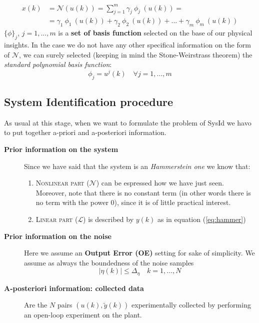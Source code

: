 \begin{equation}
    \begin{aligned}
        x(k)&=\mathcal{N}(u(k))=\sum_{j=1}^m {\gamma_j \ \phi_j\ (u(k)) }=\\
        &=\gamma_1\ {\phi_1\ (u(k))}+\gamma_2 \ {\phi_2\ (u(k))}+...+\gamma_m\ {\phi_m\ (u(k))}
    \end{aligned}
\end{equation}
$\{\phi\}_j$, $j=1,...,m$ is a \textbf{set of basis function} selected on the base of our physical insights. In the case we do not have any other specifical information on the form of $\mathcal{N}$, we can surely selected (keeping in mind the Stone-Weirstrass theorem) the \textit{standard polynomial basis function}:
\begin{equation*}
    \phi_j=u^j(k) \quad   \forall j=1,...,m
\end{equation*}    

\subsection{System Identification procedure}
As usual at this stage, when we want to formulate the problem of SysId we havo to put together a-priori and a-posteriori information. \begin{description}
    \item[\textbf{Prior information on the system}] Since we have said that the system is an \textit{Hammerstein one} we know that:
    \begin{enumerate}
        \item \textsc{Nonlinear part ($\mathcal{N}$)} can be espressed how we have just seen. Moreover, note that there is no constant term (in other words there is no term with the power 0), since it is of little practical interest.
        \item \textsc{Linear part ($\mathcal{L}$)} is described by $y(k)$ as in equation (\ref{eq:hammer})
    \end{enumerate}
    \item[\textbf{Prior information on the noise}] Here we assume an \textbf{Output Error (OE)} setting for sake of simplicity. We assume as always the boundedness of the noise samples
    \begin{equation*}
        \vert \eta(k) \vert \le \Delta_\eta \quad k=1,...,N
    \end{equation*}
    \item[\textbf{A-posteriori information: collected data}] Are the $N$ pairs $(u(k),\tilde{y}(k))$ experimentally collected by performing an open-loop experiment on the plant.
\end{description}

